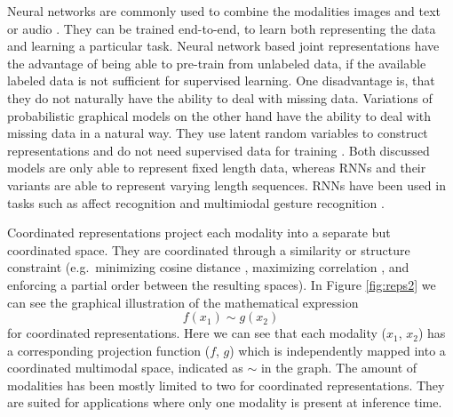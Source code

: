 \documentclass{article}
\begin{document}
Neural networks are commonly used to combine the modalities images and text \citep{silberer2014learning} or audio \citep{mroueh2015deep, ngiam2011multimodal, wu2014exploring}. They can be trained end-to-end, to learn both representing the data and learning a particular task. Neural network based joint representations have the advantage of being able to pre-train from unlabeled data, if the available labeled data is not sufficient for supervised learning. One disadvantage is, that they do not naturally have the ability to deal with missing data. Variations of probabilistic graphical models on the other hand have the ability to deal with missing data in a natural way. They use latent random variables to construct representations \citep{bengio2013represent} and do not need supervised data for training \citep{salakhutdinov2009boltz}. Both discussed models are only able to represent fixed length data, whereas RNNs and their variants are able to represent varying length sequences. RNNs have been used in tasks such as affect recognition \citep{chen2015multi, nicolaou2011contin} and multimiodal gesture recognition \citep{rajagopalan2016extend}.

Coordinated representations project each modality into a separate but coordinated space. They are coordinated through a similarity or structure constraint (e.g.\ minimizing cosine distance \citep{frome2013devise}, maximizing correlation \citep{andrew2013deep}, and enforcing a partial order \citep{vendrov2016order} between the resulting spaces). In Figure \ref{fig:reps2} we can see the graphical illustration of the mathematical expression
\begin{equation}
f(x_1) \sim g(x_2)
\end{equation}
for coordinated representations. Here we can see that each modality ($x_1$, $x_2$) has a corresponding projection function ($f$, $g$) which is independently mapped into a coordinated multimodal space, indicated as $\sim$ in the graph. The amount of modalities has been mostly limited to two for coordinated representations. They are suited for applications where only one modality is present at inference time.
\end{document}
